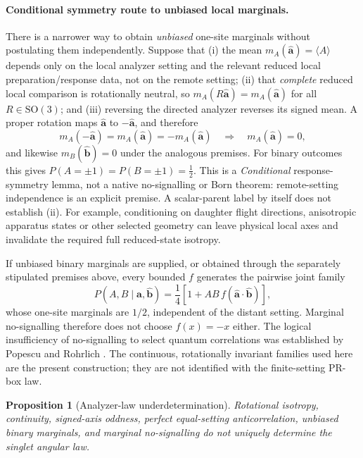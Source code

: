 \documentclass[11pt]{article}
\newtheorem{proposition}[theorem]{Proposition}
\theoremstyle{remark}
\newcommand{\SO}{\mathrm{SO}(3)}
\newcommand{\ahat}{\hat{\bm a}}
\newcommand{\bhat}{\hat{\bm b}}
\begin{document}
\paragraph{Conditional symmetry route to unbiased local marginals.}
There is a narrower way to obtain \emph{unbiased} one-site marginals
without postulating them independently.  Suppose that (i) the mean
\(m_A(\ahat)=\langle A\rangle\) depends only on the local analyzer setting
and the relevant reduced local preparation/response data, not on the remote
setting; (ii) that \emph{complete} reduced local comparison is rotationally
neutral, so \(m_A(R\ahat)=m_A(\ahat)\) for all \(R\in\SO\); and (iii)
reversing the directed analyzer reverses its signed mean.  A proper
rotation maps \(\ahat\) to \(-\ahat\), and therefore
\begin{equation}
  m_A(-\ahat)=m_A(\ahat)=-m_A(\ahat)
  \quad\Longrightarrow\quad
  \boxed{m_A(\ahat)=0,}
  \label{eq:conditional_local_marginal}
\end{equation}
and likewise \(m_B(\bhat)=0\) under the analogous premises.  For binary
outcomes this gives \(P(A=\pm1)=P(B=\pm1)=\tfrac12\).
This is a \emph{Conditional} response-symmetry lemma, not a native
no-signalling or Born theorem: remote-setting independence is an explicit
premise.  A scalar-parent label by itself does not establish (ii).  For
example, conditioning on daughter flight directions, anisotropic
apparatus states or other selected geometry can leave physical local axes
and invalidate the required full reduced-state isotropy.

If unbiased binary marginals are supplied, or obtained through the
separately stipulated premises above, every bounded \(f\) generates the
pairwise joint family
\begin{equation}
  P(A,B\mid\ahat,\bhat)
  =\frac14\left[1+AB\,f(\ahat\cdot\bhat)\right],
  \label{eq:general_joint}
\end{equation}
whose one-site marginals are \(1/2\), independent of the distant setting.  Marginal no-signalling
therefore does not choose \(f(x)=-x\) either.  The logical insufficiency
of no-signalling to select quantum correlations was established by
Popescu and Rohrlich \cite{PopescuRohrlich1994}.  The continuous,
rotationally invariant families used here are the present construction;
they are not identified with the finite-setting PR-box law.

\begin{proposition}[Analyzer-law underdetermination]
Rotational isotropy, continuity, signed-axis oddness, perfect equal-setting anticorrelation, unbiased
binary marginals, and marginal no-signalling do not uniquely determine the singlet angular law.
\end{proposition}
\end{document}
